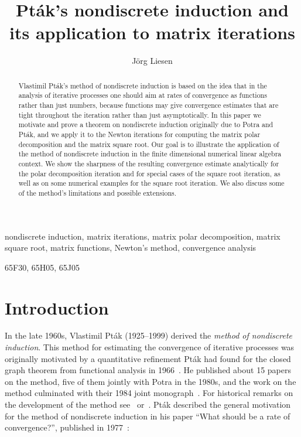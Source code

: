 \documentclass{siamltex}
\begin{document}
\title{Pt\'ak's nondiscrete induction and its application to matrix iterations}

\author{J\"org Liesen\footnotemark[1]}


\maketitle

\begin{abstract}
Vlastimil Pt\'ak's method of nondiscrete induction is based on the idea that
in the analysis of iterative processes one should aim at rates of convergence
as functions rather than just numbers, because functions may give convergence
estimates that are tight throughout the iteration rather than just asymptotically. 
In this paper we motivate and prove a theorem on nondiscrete induction
originally due to Potra and Pt\'ak,
and we apply it to the Newton iterations for computing the matrix polar decomposition
and the matrix square root. Our goal is to illustrate the application of the
method of nondiscrete induction in the finite dimensional numerical linear algebra
context. We show the sharpness of the resulting convergence estimate analytically
for the polar decomposition iteration and for special cases of the square
root iteration, as well as on some numerical examples for the square root iteration.
We also discuss some of the method's limitations and possible extensions.
\end{abstract}

\begin{keywords}
nondiscrete induction, matrix iterations, matrix polar decomposition, matrix square root,
matrix functions, Newton's method, convergence analysis
\end{keywords}

\begin{AMS}
65F30, 65H05, 65J05
\end{AMS}

\section{Introduction}
In the late 1960s, Vlastimil Pt\'ak (1925--1999) derived the {\em method of
nondiscrete induction}. This method for estimating the convergence of
iterative processes was originally motivated by a quantitative refinement
Pt\'ak had found for the closed graph theorem from functional
analysis in 1966~\cite{Pta66}. He published about 15 papers on the method,
five of them jointly with Potra in the 1980s, and the work on the method
culminated with their 1984 joint monograph~\cite{PotPtaBook84}. For historical
remarks on the development of the method see~\cite[Preface]{PotPtaBook84}
or~\cite[pp.~67--68]{Pta89}. 
Pt\'ak described the general motivation for the method of nondiscrete induction
in his paper ``What should be a rate of convergence?'', published in
1977~\cite{Pta77}:
\end{document}
